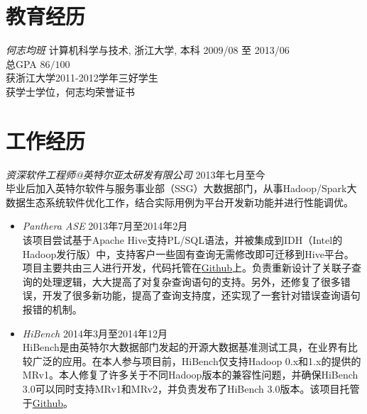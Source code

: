 \documentclass[line,margin]{res}
\begin{document}
\address{联系电话:\sl +86-152-1686-1267}
\address{E-mail:\sl me at daoyuan.wang}


\begin{resume}

\section{教育经历} {\sl 何志均班} 计算机科学与技术, 浙江大学, 本科 \hfill 2009/08 至 2013/06\\
                总GPA $86/100$\\
                获浙江大学2011-2012学年三好学生\\
                获学士学位，何志均荣誉证书\\

\section{工作经历} 
    {\sl 资深软件工程师@英特尔亚太研发有限公司} \hfill         2013年七月至今\\
    毕业后加入英特尔软件与服务事业部（SSG）大数据部门，从事Hadoop/Spark大数据生态系统软件优化工作，结合实际用例为平台开发新功能并进行性能调优。\\
        \begin{itemize}
            \item{\sl Panthera ASE} \hfill        2013年7月至2014年2月\\
                该项目尝试基于Apache Hive支持PL/SQL语法，并被集成到IDH（Intel的Hadoop发行版）中，支持客户一些固有查询无需修改即可迁移到Hive平台。项目主要共由三人进行开发，代码托管在\href{https://github.com/intel-hadoop/project-panthera}{Github}上。负责重新设计了关联子查询的处理逻辑，大大提高了对复杂查询语句的支持。另外，还修复了很多错误，开发了很多新功能，提高了查询支持度，还实现了一套针对错误查询语句报错的机制。\\

             \item{\sl HiBench} \hfill        2014年3月至2014年12月\\
                HiBench是由英特尔大数据部门发起的开源大数据基准测试工具，在业界有比较广泛的应用。在本人参与项目前，HiBench仅支持Hadoop 0.x和1.x的提供的MRv1。本人修复了许多关于不同Hadoop版本的兼容性问题，并确保HiBench 3.0可以同时支持MRv1和MRv2，并负责发布了HiBench 3.0版本。该项目托管于\href{https://github.com/intel-hadoop/HiBench}{Github}。\\
                   

\end{itemize}
\end{resume}
\end{document}
